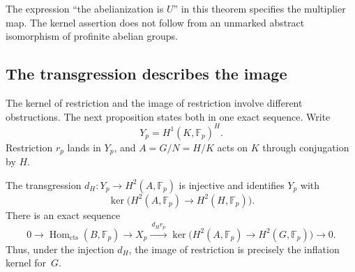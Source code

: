 The expression ``the abelianization is $U$'' in this theorem specifies
the multiplier map. The kernel assertion does not follow from an
unmarked abstract isomorphism of profinite abelian groups.

\subsection{The transgression describes the image}

The kernel of restriction and the image of restriction involve different
obstructions. The next proposition states both in one exact sequence.
Write
\[
 Y_p=H^1(K,\mathbb F_p)^H.
\]
Restriction $r_p$ lands in $Y_p$, and $A=G/N=H/K$ acts on $K$ through
conjugation by $H$.

\begin{proposition}\label{prop:transgression-comparison}
The transgression
$d_H:Y_p\to H^2(A,\mathbb F_p)$ is injective and identifies $Y_p$ with
\[
 \ker\bigl(H^2(A,\mathbb F_p)\longrightarrow H^2(H,\mathbb F_p)\bigr).
\]
There is an exact sequence
\[
 0\longrightarrow\operatorname{Hom}_{\mathrm{cts}}(B,\mathbb F_p)
 \longrightarrow X_p
 \xrightarrow{\ d_Hr_p\ }
 \ker\bigl(H^2(A,\mathbb F_p)\longrightarrow H^2(G,\mathbb F_p)\bigr)
 \longrightarrow0.
\]
Thus, under the injection $d_H$, the image of restriction is precisely
the inflation kernel for~$G$.
\end{proposition}

